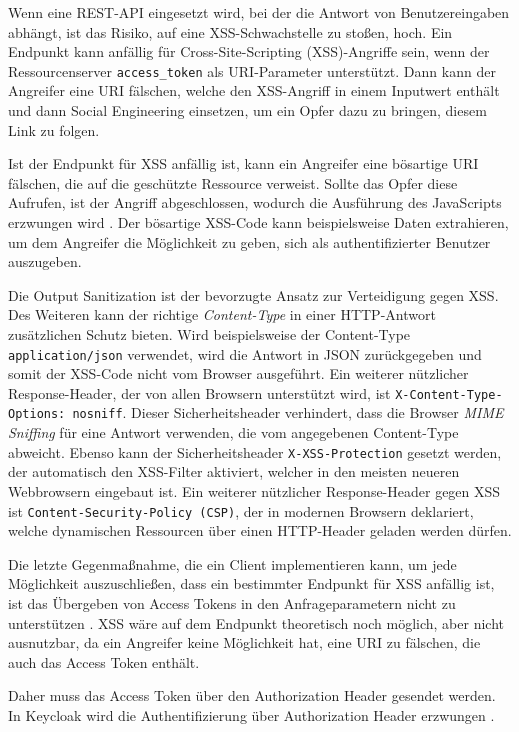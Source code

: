 Wenn eine REST-API eingesetzt wird, bei der die Antwort von Benutzereingaben abhängt, ist das Risiko, auf eine XSS-Schwachstelle zu stoßen, hoch. Ein Endpunkt kann anfällig für Cross-Site-Scripting (XSS)-Angriffe sein, wenn der Ressourcenserver \texttt{access\_token} als URI-Parameter unterstützt. Dann kann der Angreifer eine URI fälschen, welche den XSS-Angriff in einem Inputwert enthält und dann Social Engineering einsetzen, um ein Opfer dazu zu bringen, diesem Link zu folgen. \cite{SSEB_OAuth2inAction}

Ist der Endpunkt für XSS anfällig ist, kann ein Angreifer eine bösartige URI fälschen, die auf die geschützte Ressource verweist. Sollte das Opfer diese Aufrufen, ist der Angriff abgeschlossen, wodurch die Ausführung des JavaScripts erzwungen wird \cite{SSEB_OAuth2inAction}. Der bösartige XSS-Code kann beispielsweise Daten extrahieren, um dem Angreifer die Möglichkeit zu geben, sich als authentifizierter Benutzer auszugeben. 

Die Output Sanitization ist der bevorzugte Ansatz zur Verteidigung gegen XSS. Des Weiteren kann der richtige \textit{Content-Type} in einer HTTP-Antwort zusätzlichen Schutz bieten. Wird beispielsweise der Content-Type \texttt{application/json} verwendet, wird die Antwort in JSON zurückgegeben und somit der XSS-Code nicht vom Browser ausgeführt. Ein weiterer nützlicher Response-Header, der von allen Browsern unterstützt wird, ist \texttt{X-Content-Type-Options: nosniff}. Dieser Sicherheitsheader verhindert, dass die Browser \textit{MIME Sniffing} für eine Antwort verwenden, die vom angegebenen Content-Type abweicht. Ebenso kann der Sicherheitsheader \texttt{X-XSS-Protection} gesetzt werden, der automatisch den XSS-Filter aktiviert, welcher in den meisten neueren Webbrowsern eingebaut ist. Ein weiterer nützlicher Response-Header gegen XSS ist \texttt{Content-Security-Policy (CSP)}, der in modernen Browsern deklariert, welche dynamischen Ressourcen über einen HTTP-Header geladen werden dürfen.

Die letzte Gegenmaßnahme, die ein Client implementieren kann, um jede Möglichkeit auszuschließen, dass ein bestimmter Endpunkt für XSS anfällig ist, ist das Übergeben von Access Tokens in den Anfrageparametern nicht zu unterstützen \cite{SSEB_OAuth2inAction}. XSS wäre auf dem Endpunkt theoretisch noch möglich, aber nicht ausnutzbar, da ein Angreifer keine Möglichkeit hat, eine URI zu fälschen, die auch das Access Token enthält\cite{SSEB_OAuth2inAction}. 

Daher muss das Access Token über den Authorization Header gesendet werden. In Keycloak wird die Authentifizierung über Authorization Header erzwungen \cite{SSEB_keycloakDocs}.

